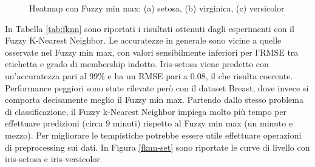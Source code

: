 \documentclass[11pt,  oneside, openany]{book}
\begin{document}
\begin{figure}[h!]
		\centering
		\quad
		 \quad
		 \quad
		\caption{Heatmap con Fuzzy min max: (a) setosa, (b) virginica, (c) versicolor}
		\label{heatmapgfmm}
	\end{figure}	



In Tabella \ref{tab:fknn} sono riportati i risultati ottenuti dagli esperimenti con il Fuzzy K-Nearest Neighbor. 
Le accuratezze in generale sono vicine a quelle osservate nel Fuzzy min max, con valori sensibilmente inferiori per l'RMSE tra etichetta e grado di membership indotto. Iris-setosa viene predetto con un'accuratezza pari al 99\% e ha un RMSE pari a 0.08, il che risulta coerente. Performance peggiori sono state rilevate però con il dataset Breast, dove invece si comporta decisamente meglio il Fuzzy min max. Partendo dallo stesso problema di classificazione, il Fuzzy k-Nearest Neighbor impiega molto più tempo per effettuare predizioni (circa 9 minuti) rispetto al Fuzzy min max (un minuto e mezzo). Per migliorare le tempistiche potrebbe essere utile effettuare operazioni di preprocessing sui dati. In Figura \ref{fknn-set} sono riportate le curve di livello con iris-setosa e iris-versicolor. 
\end{document}
